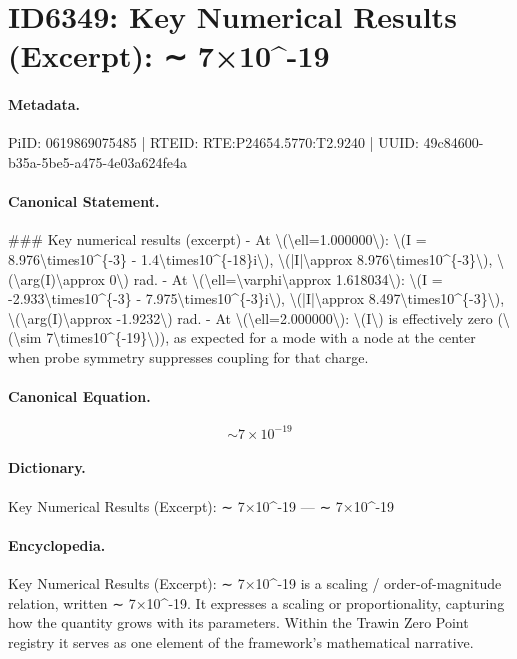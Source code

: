 \section*{ID6349: Key Numerical Results (Excerpt): ∼ 7×10\textasciicircum{}-19}
\paragraph{Metadata.}
PiID: 0619869075485 | RTEID: RTE:P24654.5770:T2.9240 | UUID: 49c84600-b35a-5be5-a475-4e03a624fe4a

\paragraph{Canonical Statement.}
\#\#\# Key numerical results (excerpt) - At \textbackslash{}(\textbackslash{}ell=1.000000\textbackslash{}): \textbackslash{}(I = 8.976\textbackslash{}times10\textasciicircum{}\{-3\} - 1.4\textbackslash{}times10\textasciicircum{}\{-18\}i\textbackslash{}), \textbackslash{}(|I|\textbackslash{}approx 8.976\textbackslash{}times10\textasciicircum{}\{-3\}\textbackslash{}), \textbackslash{}(\textbackslash{}arg(I)\textbackslash{}approx 0\textbackslash{}) rad. - At \textbackslash{}(\textbackslash{}ell=\textbackslash{}varphi\textbackslash{}approx 1.618034\textbackslash{}): \textbackslash{}(I = -2.933\textbackslash{}times10\textasciicircum{}\{-3\} - 7.975\textbackslash{}times10\textasciicircum{}\{-3\}i\textbackslash{}), \textbackslash{}(|I|\textbackslash{}approx 8.497\textbackslash{}times10\textasciicircum{}\{-3\}\textbackslash{}), \textbackslash{}(\textbackslash{}arg(I)\textbackslash{}approx -1.9232\textbackslash{}) rad. - At \textbackslash{}(\textbackslash{}ell=2.000000\textbackslash{}): \textbackslash{}(I\textbackslash{}) is effectively zero (\textbackslash{}(\textbackslash{}sim 7\textbackslash{}times10\textasciicircum{}\{-19\}\textbackslash{})), as expected for a mode with a node at the center when probe symmetry suppresses coupling for that charge.

\paragraph{Canonical Equation.}
\[
\sim 7\times10^{-19}
\]

\paragraph{Dictionary.}
Key Numerical Results (Excerpt): ∼ 7×10\textasciicircum{}-19 — ∼ 7×10\textasciicircum{}-19

\paragraph{Encyclopedia.}
Key Numerical Results (Excerpt): ∼ 7×10\textasciicircum{}-19 is a scaling / order-of-magnitude relation, written ∼ 7×10\textasciicircum{}-19. It expresses a scaling or proportionality, capturing how the quantity grows with its parameters. Within the Trawin Zero Point registry it serves as one element of the framework's mathematical narrative.
